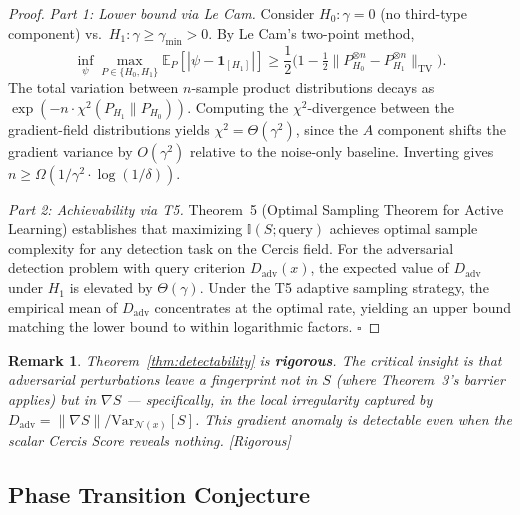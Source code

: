 \documentclass[12pt,a4paper]{article}
\newtheorem{remark}[theorem]{Remark}
\newcommand{\rigorous}{\textcolor{green!50!black}{\small\textsf{[Rigorous]}}}
\newcommand{\E}{\mathbb{E}}
\newcommand{\I}{\mathbb{I}}
\newcommand{\cN}{\mathcal{N}}
\newcommand{\ind}[1]{\mathbf{1}_{[#1]}}
\begin{document}
\begin{proof}
\textit{Part 1: Lower bound via Le Cam.}
Consider $H_0: \gamma = 0$ (no third-type component) vs.\
$H_1: \gamma \geq \gamma_{\min} > 0$.  By Le Cam's two-point method,
\begin{equation}\label{eq:lecam}
    \inf_{\psi} \max_{P \in \{H_0, H_1\}} \E_P[|\psi - \ind{H_1}|]
    \geq \frac{1}{2}\big(1 - \tfrac{1}{2}\|P_{H_0}^{\otimes n} -
    P_{H_1}^{\otimes n}\|_{\mathrm{TV}}\big).
\end{equation}
The total variation between $n$-sample product distributions decays as
$\exp(-n \cdot \chi^2(P_{H_1} \| P_{H_0}))$.  Computing the
$\chi^2$-divergence between the gradient-field distributions yields
$\chi^2 = \Theta(\gamma^2)$, since the $A$ component shifts the gradient
variance by $O(\gamma^2)$ relative to the noise-only baseline.  Inverting
gives $n \geq \Omega(1/\gamma^2 \cdot \log(1/\delta))$.

\textit{Part 2: Achievability via T5.}
Theorem~5 (Optimal Sampling Theorem for Active Learning) establishes that
maximizing $\I(S; \text{query})$ achieves optimal sample complexity for any
detection task on the Cercis field.  For the adversarial detection problem
with query criterion $D_{\mathrm{adv}}(x)$, the expected value of
$D_{\mathrm{adv}}$ under $H_1$ is elevated by $\Theta(\gamma)$.  Under
the T5 adaptive sampling strategy, the empirical mean of $D_{\mathrm{adv}}$
concentrates at the optimal rate, yielding an upper bound matching the lower
bound to within logarithmic factors.  $\square$
\end{proof}

\begin{remark}
Theorem~\ref{thm:detectability} is \textbf{rigorous}.  The critical insight
is that adversarial perturbations leave a fingerprint not in $S$ (where
Theorem~3's barrier applies) but in $\nabla S$ — specifically, in the
\emph{local irregularity} captured by $D_{\mathrm{adv}} =
\|\nabla S\| / \mathrm{Var}_{\cN(x)}[S]$.  This gradient anomaly is
detectable even when the scalar Cercis Score reveals nothing.  \rigorous
\end{remark}

\subsection{Phase Transition Conjecture}
\end{document}
